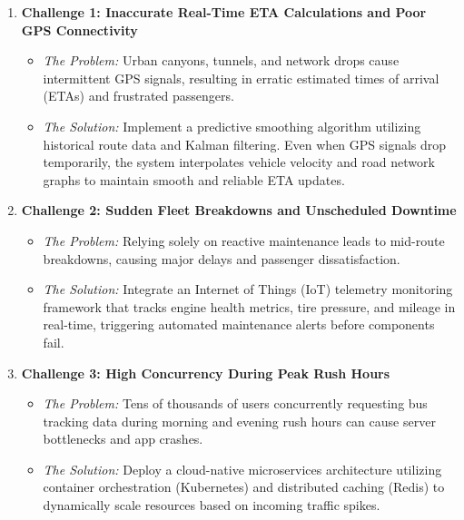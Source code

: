 \documentclass[11pt, a4paper]{article}
\begin{document}
\begin{enumerate}[leftmargin=*, label=\arabic*.]
    \item \textbf{Challenge 1: Inaccurate Real-Time ETA Calculations and Poor GPS Connectivity}
    \begin{itemize}[leftmargin=*]
        \item \textit{The Problem:} Urban canyons, tunnels, and network drops cause intermittent GPS signals, resulting in erratic estimated times of arrival (ETAs) and frustrated passengers.
        \item \textit{The Solution:} Implement a predictive smoothing algorithm utilizing historical route data and Kalman filtering. Even when GPS signals drop temporarily, the system interpolates vehicle velocity and road network graphs to maintain smooth and reliable ETA updates.
    \end{itemize}
    
    \item \textbf{Challenge 2: Sudden Fleet Breakdowns and Unscheduled Downtime}
    \begin{itemize}[leftmargin=*]
        \item \textit{The Problem:} Relying solely on reactive maintenance leads to mid-route breakdowns, causing major delays and passenger dissatisfaction.
        \item \textit{The Solution:} Integrate an Internet of Things (IoT) telemetry monitoring framework that tracks engine health metrics, tire pressure, and mileage in real-time, triggering automated maintenance alerts before components fail.
    \end{itemize}

    \item \textbf{Challenge 3: High Concurrency During Peak Rush Hours}
    \begin{itemize}[leftmargin=*]
        \item \textit{The Problem:} Tens of thousands of users concurrently requesting bus tracking data during morning and evening rush hours can cause server bottlenecks and app crashes.
        \item \textit{The Solution:} Deploy a cloud-native microservices architecture utilizing container orchestration (Kubernetes) and distributed caching (Redis) to dynamically scale resources based on incoming traffic spikes.
    \end{itemize}
\end{enumerate}
\end{document}
